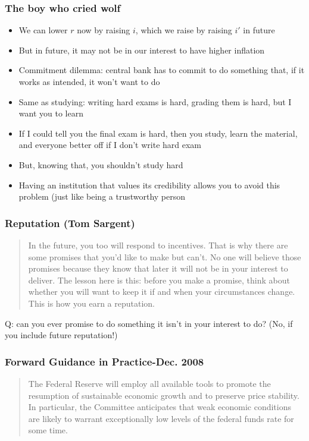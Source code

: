 \documentclass{beamer}
\begin{document}
\begin{frame}
\frametitle[alignment=center]{The boy who cried wolf}
\begin{itemize}
\item We can lower $r$ now by raising $i$, which we raise by raising $i'$ in future
\bigskip
\item But in future, it may not be in our interest to have higher inflation
\bigskip
\item Commitment dilemma: central bank has to commit to do something that, if it works as intended, it won't want to do
\bigskip
\item Same as studying: writing hard exams is hard, grading them is hard, but I want you to learn
\bigskip
\item If I could tell you the final exam is hard, then you study, learn the material, and everyone better off if I don't write hard exam
\bigskip
\item But, knowing that, you shouldn't study hard
\bigskip
\item Having an institution that values its credibility allows you to avoid this problem (just like being a trustworthy person
\end{itemize}
\end{frame}


\begin{frame}
\frametitle[alignment=center]{Reputation (Tom Sargent)}
\begin{quote}
 In the future, you too will respond to incentives. That is why there are
some promises that you'd like to make but can't. No one will believe those
promises because they know that later it will not be in your interest to
deliver. The lesson here is this: before you make a promise, think about
whether you will want to keep it if and when your circumstances change.
This is how you earn a reputation.
\end{quote}
Q: can you ever promise to do something it isn't in your interest to do? (No, if you include future reputation!)
\end{frame}

\begin{frame}
\frametitle[alignment=center]{Forward Guidance in Practice-Dec. 2008}
\begin{quote}
The Federal Reserve will employ all available tools to promote the resumption of sustainable economic growth and to preserve price stability. In particular, the Committee anticipates that weak economic conditions are likely to warrant exceptionally low levels of the federal funds rate for some time.
\end{quote}
\end{frame}
\end{document}
